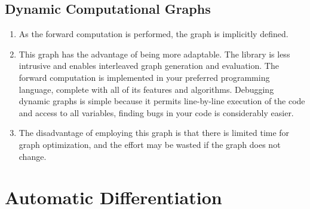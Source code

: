 \subsection{Dynamic Computational Graphs}

\begin{enumerate}
    \item As the forward computation is performed, the graph is implicitly defined.

    \item This graph has the advantage of being more adaptable.
    The library is less intrusive and enables interleaved graph generation and evaluation.
    The forward computation is implemented in your preferred programming language, complete with all of its features and algorithms.
    Debugging dynamic graphs is simple because it permits line-by-line execution of the code and access to all variables, finding bugs in your code is considerably easier.

    \item The disadvantage of employing this graph is that there is limited time for graph optimization, and the effort may be wasted if the graph does not change.
\end{enumerate}






\section{Automatic Differentiation}

